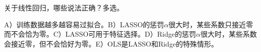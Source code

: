 关于线性回归，哪些说法正确？多选。


A）训练数据越多越容易过拟合。B）LASSO的惩罚\ensuremath{\alpha}很大时，某些系数只接近零而不会恰为零。C）LASSO可用于特征选择。D）Ridge的惩罚\ensuremath{\alpha}很大时，某些系数会接近零，但不会恰好为零。E）OLS是LASSO和Ridge的特殊情形。
